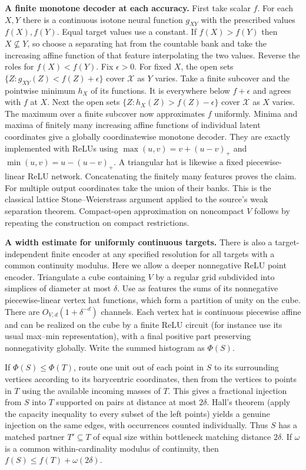 \documentclass[10pt]{article}
\begin{document}
\textbf{A finite monotone decoder at each accuracy.} First take scalar $f$. For each $X,Y$ there is a continuous isotone neural function $g_{XY}$ with the prescribed values $f(X),f(Y)$. Equal target values use a constant. If $f(X)>f(Y)$ then $X\not\subseteq Y$, so choose a separating hat from the countable bank and take the increasing affine function of that feature interpolating the two values. Reverse the roles for $f(X)<f(Y)$. Fix $\epsilon>0$. For fixed $X$, the open sets $\{Z:g_{XY}(Z)<f(Z)+\epsilon\}$ cover $\mathcal X$ as $Y$ varies. Take a finite subcover and the pointwise minimum $h_X$ of its functions. It is everywhere below $f+\epsilon$ and agrees with $f$ at $X$. Next the open sets $\{Z:h_X(Z)>f(Z)-\epsilon\}$ cover $\mathcal X$ as $X$ varies. The maximum over a finite subcover now approximates $f$ uniformly. Minima and maxima of finitely many increasing affine functions of individual latent coordinates give a globally coordinatewise monotone decoder. They are exactly implemented with ReLUs using $\max(u,v)=v+(u-v)_+$ and $\min(u,v)=u-(u-v)_+$. A triangular hat is likewise a fixed piecewise-linear ReLU network. Concatenating the finitely many features proves the claim. For multiple output coordinates take the union of their banks. This is the classical lattice Stone--Weierstrass argument applied to the source's weak separation theorem. Compact-open approximation on noncompact $V$ follows by repeating the construction on compact restrictions.

\textbf{A width estimate for uniformly continuous targets.} There is also a target-independent finite encoder at any specified resolution for all targets with a common continuity modulus. Here we allow a deeper nonnegative ReLU point encoder. Triangulate a cube containing $V$ by a regular grid subdivided into simplices of diameter at most $\delta$. Use as features the sums of its nonnegative piecewise-linear vertex hat functions, which form a partition of unity on the cube. There are $O_{V,d}(1+\delta^{-d})$ channels. Each vertex hat is continuous piecewise affine and can be realized on the cube by a finite ReLU circuit (for instance use its usual max--min representation), with a final positive part preserving nonnegativity globally. Write the summed histogram as $\Phi(S)$.

If $\Phi(S)\le\Phi(T)$, route one unit out of each point in $S$ to its surrounding vertices according to its barycentric coordinates, then from the vertices to points in $T$ using the available incoming masses of $T$. This gives a fractional injection from $S$ into $T$ supported on pairs at distance at most $2\delta$. Hall's theorem (apply the capacity inequality to every subset of the left points) yields a genuine injection on the same edges, with occurrences counted individually. Thus $S$ has a matched partner $T'\subseteq T$ of equal size within bottleneck matching distance $2\delta$. If $\omega$ is a common within-cardinality modulus of continuity, then $f(S)\le f(T)+\omega(2\delta)$.
\end{document}
